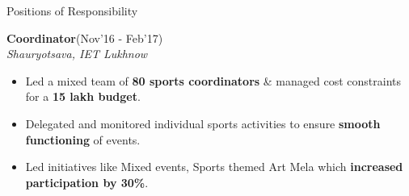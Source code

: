 \documentclass{resume}
\newcommand{\sepval}{-0.5em}
\begin{document}
\begin{rSection}{Positions of Responsibility}

\vspace{-.4cm}
 
\item{\bf {\bf Coordinator}}\hfill{(Nov'16 - Feb'17)}\\ \emph{Shauryotsava, IET Lukhnow}\\
[-0.4cm]
  
\begin{itemize}[leftmargin=*]
    
	\itemsep \sepval
 
	\item Led a mixed team of {\bf 80 sports coordinators} \& managed cost constraints for a {\bf 15 lakh budget}.

	\item Delegated and monitored individual sports activities to ensure {\bf smooth functioning} of events.
	 
	\item Led initiatives like Mixed events, Sports themed Art Mela which {\bf increased participation by 30\%}.
 
\end{itemize}

\end{rSection}
\end{document}
